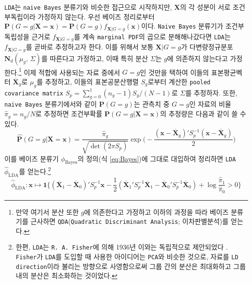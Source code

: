 \documentclass[11pt,onecolumn,twoside,a4size]{gsag3jnl}
\begin{document}
\texttt{LDA}는 \texttt{naive Bayes} 분류기와 비슷한 접근으로 시작하지만, $\mathbf{X}$의 각 성분이 서로 조건부독립이라 가정하지 않는다. 우선 베이즈 정리로부터 $\mathbf{P}(G=g\vert\mathbf{X}=\mathbf{x})=\mathbf{P}(G=g)f_{\mathbf{X}\vert G=g}(\mathbf{x})$이다. \texttt{Naive Bayes} 분류기가 조건부독립성을 근거로 $f_{\mathbf{X}\vert G=g}$를 계속 \texttt{marginal PDF}의 곱으로 분해해나갔다면 \texttt{LDA}는 $f_{\mathbf{X}\vert G=g}$를 곧바로 추정하고자 한다. 이를 위해서 보통 $\mathbf{X}\vert G=g$가 다변량정규분포 $\mathbf{N}_d(\mu_g,\,\Sigma)$를 따른다고 가정하고, 이때 특히 분산 $\Sigma$는 $g$에 의존하지 않는다고 가정한다.\footnote{만약 여기서 분산 또한 $g$에 의존한다고 가정하고 이하의 과정을 따라 베이즈 분류기를 근사하면 \texttt{QDA}(\texttt{Quadratic Discriminant Analysis}; 이차판별분석)를 얻는다.} 이제 적합에 사용되는 자료 중에서 $G=g$인 것만을 택하여 이들의 표본평균벡터 $\overline{\mathbf{X}}_g$로 $\mu_g$를 추정하고, 이들의 표본공분산행렬 $S_g$로부터 계산한 \texttt{pooled covariance matrix} $S_p=\sum_{g=0}^1(n_g-1)S_g/(N-1)$로 $\Sigma$를 추정하자. 또한, \texttt{naive Bayes} 분류기에서와 같이 $\mathbf{P}(G=g)$는 관측치 중 $G=g$인 자료의 비율 $\widehat{\pi}_g=n_g/N$로 추정하면 조건부확률 $\mathbf{P}(G=g\vert\mathbf{X}=\mathbf{x})$의 추정량은 다음과 같이 쓸 수 있다.
\begin{equation}
  \widehat{\mathbf{P}}(G=g\vert\mathbf{X}=\mathbf{x})=\frac{\widehat{\pi}_g}{\sqrt{\det(2\pi S_p)}}\exp\bigg(-\frac{(\mathbf{x}-\overline{\mathbf{X}}_g)'S_p^{-1}(\mathbf{x}-\overline{\mathbf{X}}_g)}{2}\bigg)
\end{equation}
이를 베이즈 분류기 $\phi_\mathrm{Bayes}$의 정의(식 \ref{eq:Bayes})에 그대로 대입하여 정리하면 \texttt{LDA} $\widehat{\phi}_\mathrm{LDA}$를 얻는다.\footnote{한편, \texttt{LDA}는 \texttt{R. A. Fisher}에 의해 1936년 이와는 독립적으로 제안되었다 \texttt{\citep{fisher1936use}}. \texttt{Fisher}가 \texttt{LDA}를 도입할 때 사용한 아이디어는 \texttt{PCA}와 비슷한 것으로, 자료를 \texttt{LD direction}이라 불리는 방향으로 사영함으로써 그룹 간의 분산은 최대화하고 그룹 내의 분산은 최소화하는 것이었다.}
\begin{equation}
  \widehat{\phi}_\mathrm{LDA}:\mathbf{x}\mapsto\mathbf{1}\bigg\{(\overline{\mathbf{X}}_1-\overline{\mathbf{X}}_0)'S_p^{-1}\mathbf{x}-\frac{1}{2}(\overline{\mathbf{X}}_1'S_p^{-1}\overline{\mathbf{X}}_1-\overline{\mathbf{X}}_0'S_p^{-1}\overline{\mathbf{X}}_0)+\log\frac{\widehat{\pi}_1}{\widehat{\pi}_0}>0\bigg\}
\end{equation}
\end{document}
